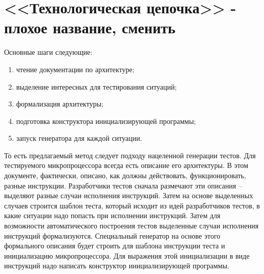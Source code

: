 \documentclass[14pt]{extreport}
\begin{document}
\section{<<Технологическая цепочка>> - плохое название, сменить}
Основные шаги следующие:
\begin{enumerate}
  \item чтение документации по архитектуре;
  \item выделение интересных для тестирования ситуаций;
  \item формализация архитектуры;
  \item подготовка конструктора инициализирующей программы;
  \item запуск генератора для каждой ситуации.
\end{enumerate}

То есть предлагаемый метод следует подходу нацеленной генерации тестов. Для тестируемого микропроцессора всегда есть описание его архитектуры. В этом документе, фактически, описано, как должны действовать, функционировать, разные инструкции. Разработчики тестов сначала размечают эти описания -- выделяют разные случаи исполнения инструкций. Затем на основе выделенных случаев строится шаблон теста, который исходит из идей разработчиков тестов, в какие ситуации надо попасть при исполнении инструкций. Затем для возможности автоматического построения тестов выделенные случаи исполнения инструкций формализуются. Специальный генератор на основе этого формального описания будет строить для шаблона инструкции теста и инициализацию микропроцессора.
Для выражения этой инициализации в виде инструкций надо написать конструктор инициализирующей программы.
\end{document}
